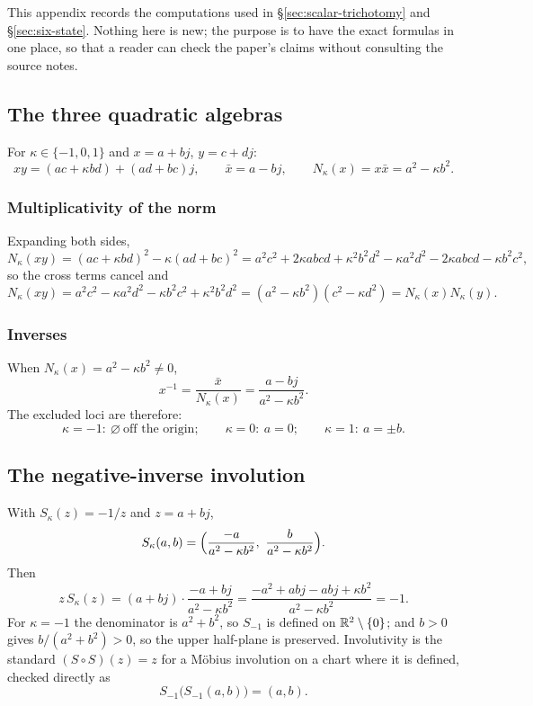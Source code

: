 \label{app:scalar-body}

This appendix records the computations used in \S\ref{sec:scalar-trichotomy} and
\S\ref{sec:six-state}.  Nothing here is new; the purpose is to have the exact
formulas in one place, so that a reader can check the paper's claims without consulting the
source notes.

\subsection{The three quadratic algebras}

For $\kappa\in\{-1,0,1\}$ and $x=a+bj$, $y=c+dj$:
\[
  xy=(ac+\kappa bd)+(ad+bc)j,\qquad
  \bar x=a-bj,\qquad
  N_\kappa(x)=x\bar x=a^{2}-\kappa b^{2}.
\]

\subsubsection{Multiplicativity of the norm}
Expanding both sides,
\[
  N_\kappa(xy)
  =(ac+\kappa bd)^{2}-\kappa(ad+bc)^{2}
  =a^{2}c^{2}+2\kappa abcd+\kappa^{2}b^{2}d^{2}
   -\kappa a^{2}d^{2}-2\kappa abcd-\kappa b^{2}c^{2},
\]
so the cross terms cancel and
\[
  N_\kappa(xy)=a^{2}c^{2}-\kappa a^{2}d^{2}-\kappa b^{2}c^{2}+\kappa^{2}b^{2}d^{2}
  =(a^{2}-\kappa b^{2})(c^{2}-\kappa d^{2})=N_\kappa(x)N_\kappa(y).
\]

\subsubsection{Inverses}
When $N_\kappa(x)=a^{2}-\kappa b^{2}\neq0$,
\[
  x^{-1}=\frac{\bar x}{N_\kappa(x)}=\frac{a-bj}{a^{2}-\kappa b^{2}} .
\]
The excluded loci are therefore:
\[
  \kappa=-1:\ \varnothing\ \text{off the origin};\qquad
  \kappa=0:\ a=0;\qquad
  \kappa=1:\ a=\pm b .
\]

\subsection{The negative-inverse involution}

With $S_\kappa(z)=-1/z$ and $z=a+bj$,
\[
  S_\kappa(a,b)=\Bigl(\frac{-a}{a^{2}-\kappa b^{2}},\ \frac{b}{a^{2}-\kappa b^{2}}\Bigr).
\]
Then
\[
  z\,S_\kappa(z)=(a+bj)\cdot\frac{-a+bj}{a^{2}-\kappa b^{2}}
  =\frac{-a^{2}+abj-abj+\kappa b^{2}}{a^{2}-\kappa b^{2}}=-1 .
\]
For $\kappa=-1$ the denominator is $a^{2}+b^{2}$, so $S_{-1}$ is defined on
$\mathbb{R}^{2}\setminus\{0\}$; and $b>0$ gives $b/(a^{2}+b^{2})>0$, so the upper half-plane is
preserved.  Involutivity is the standard $(S\circ S)(z)=z$ for a M\"obius involution on a
chart where it is defined, checked directly as
\[
  S_{-1}\bigl(S_{-1}(a,b)\bigr)=(a,b).
\]

